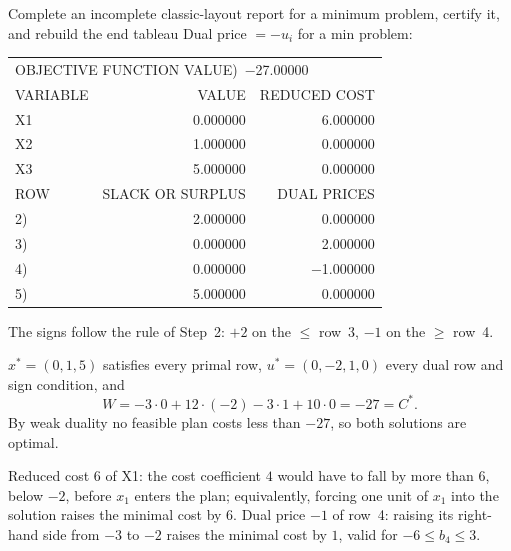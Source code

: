 \begin{worked}{Complete an incomplete classic-layout report for a minimum problem, certify it, and rebuild the end tableau}
Dual price $=-u_{i}$ for a min problem:
\begin{center}\footnotesize\ttfamily
\begin{tabular}{lrr}
\multicolumn{3}{l}{OBJECTIVE FUNCTION VALUE\quad 1)\ $-$27.00000}\\[3pt]
VARIABLE & VALUE & REDUCED COST\\
X1 & 0.000000 & 6.000000\\
X2 & 1.000000 & 0.000000\\
X3 & 5.000000 & 0.000000\\[3pt]
ROW & SLACK OR SURPLUS & DUAL PRICES\\
2) & 2.000000 & 0.000000\\
3) & 0.000000 & 2.000000\\
4) & 0.000000 & $-$1.000000\\
5) & 5.000000 & 0.000000\\
\end{tabular}
\end{center}
The signs follow the rule of Step~2: $+2$ on the $\le$ row~3, $-1$ on the
$\ge$ row~4.

$x^{*}=(0,1,5)$ satisfies every primal row, $u^{*}=(0,-2,1,0)$ every dual
row and sign condition, and
\[
  W=-3\cdot0+12\cdot(-2)-3\cdot1+10\cdot0=-27=C^{*} .
\]
By weak duality no feasible plan costs less than $-27$, so both solutions
are optimal.

Reduced cost $6$ of X1: the cost coefficient $4$ would have to fall by more
than $6$, below $-2$, before $x_{1}$ enters the plan; equivalently, forcing
one unit of $x_{1}$ into the solution raises the minimal cost by $6$. Dual
price $-1$ of row~4: raising its right-hand side from $-3$ to $-2$ raises
the minimal cost by $1$, valid for $-6\le b_{4}\le 3$.


\end{worked}
